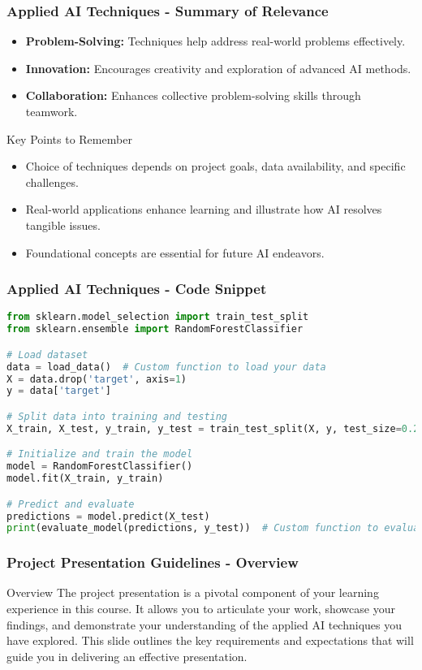 \documentclass[aspectratio=169]{beamer}
\begin{document}
\begin{frame}[fragile]
    \frametitle{Applied AI Techniques - Summary of Relevance}
    \begin{itemize}
        \item \textbf{Problem-Solving:} Techniques help address real-world problems effectively.
        \item \textbf{Innovation:} Encourages creativity and exploration of advanced AI methods.
        \item \textbf{Collaboration:} Enhances collective problem-solving skills through teamwork.
    \end{itemize}

    \begin{block}{Key Points to Remember}
        \begin{itemize}
            \item Choice of techniques depends on project goals, data availability, and specific challenges.
            \item Real-world applications enhance learning and illustrate how AI resolves tangible issues.
            \item Foundational concepts are essential for future AI endeavors.
        \end{itemize}
    \end{block}
\end{frame}

\begin{frame}[fragile]
    \frametitle{Applied AI Techniques - Code Snippet}
    \begin{lstlisting}[language=Python]
from sklearn.model_selection import train_test_split
from sklearn.ensemble import RandomForestClassifier

# Load dataset
data = load_data()  # Custom function to load your data
X = data.drop('target', axis=1)
y = data['target']

# Split data into training and testing
X_train, X_test, y_train, y_test = train_test_split(X, y, test_size=0.2, random_state=42)

# Initialize and train the model
model = RandomForestClassifier()
model.fit(X_train, y_train)

# Predict and evaluate
predictions = model.predict(X_test)
print(evaluate_model(predictions, y_test))  # Custom function to evaluate model performance
    \end{lstlisting}
\end{frame}

\begin{frame}[fragile]
    \frametitle{Project Presentation Guidelines - Overview}
    \begin{block}{Overview}
        The project presentation is a pivotal component of your learning experience in this course. It allows you to articulate your work, showcase your findings, and demonstrate your understanding of the applied AI techniques you have explored. This slide outlines the key requirements and expectations that will guide you in delivering an effective presentation.
    \end{block}
\end{frame}
\end{document}
